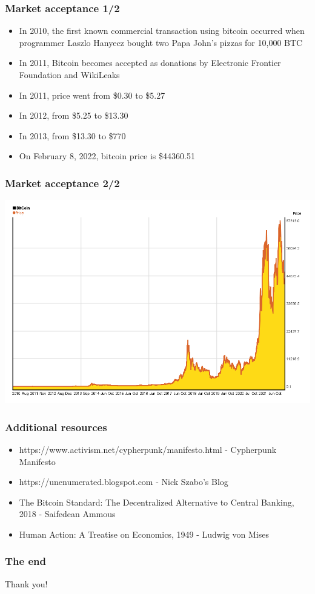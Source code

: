 \documentclass{beamer}
\begin{document}
\begin{frame}
  \frametitle{Market acceptance 1/2}
  \begin{itemize}
  \item In 2010, the first known commercial transaction using bitcoin occurred
    when programmer Laszlo Hanyecz bought two Papa John's pizzas for 10,000 BTC
  \item In 2011, Bitcoin becomes accepted as donations by Electronic Frontier
    Foundation and WikiLeaks
  \item In 2011, price went from \$0.30 to \$5.27
  \item In 2012, from \$5.25 to \$13.30
  \item In 2013, from \$13.30 to \$770
  \item On February 8,  2022, bitcoin price is \$44360.51
  \end{itemize}
\end{frame}

\begin{frame}[fragile]
  \frametitle{Market acceptance 2/2}
  \includegraphics[width=\textwidth]{bitcoin-price}
\end{frame}

\begin{frame}
  \frametitle{Additional resources}
  \begin{itemize}
  \item https://www.activism.net/cypherpunk/manifesto.html - Cypherpunk Manifesto
  \item https://unenumerated.blogspot.com - Nick Szabo's Blog
  \item The Bitcoin Standard: The Decentralized Alternative to Central Banking,
    2018 - Saifedean Ammous
  \item Human Action: A Treatise on Economics, 1949 - Ludwig von Mises
  \end{itemize}
\end{frame}

\begin{frame}
  \frametitle{The end}
  \begin{center}
    Thank you!
  \end{center}
\end{frame}
\end{document}
